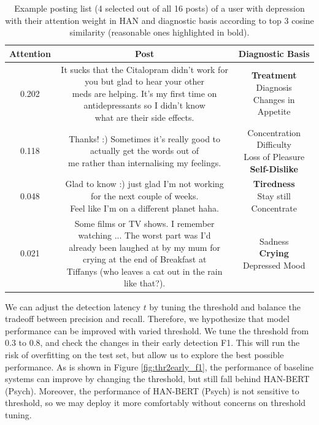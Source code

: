 \begin{table}[t]
    \centering
	\small
    \begin{tabular}{ccc}
        \hline
        Attention & Post & Diagnostic Basis \\
        \hline
        0.202 & \makecell[l]{It sucks that the Citalopram didn't work for you but glad to hear your other \\ meds are helping. It's my first time on antidepressants so I didn't know \\ what are their side effects.} & \makecell[c]{\textbf{Treatment} \\ Diagnosis \\ Changes in Appetite }\\
        \hline
        0.118 & \makecell[l]{Thanks! :) Sometimes it's really good to actually get the words out of  \\ me rather than internalising my feelings.} & \makecell[c]{Concentration Difficulty \\ Loss of Pleasure \\ \textbf{Self-Dislike}}\\
        \hline
        0.048 & \makecell[l]{Glad to know :) just glad I'm not working for the next couple of weeks. \\ Feel like I'm on a different planet haha.} & \makecell[c]{\textbf{Tiredness} \\ Stay still \\ Concentrate} \\
        \hline
        0.021 & \makecell[l]{Some films or TV shows. I remember watching ... The worst part was I'd  \\ already been laughed at by my mum for crying at the end of Breakfast at \\ Tiffanys (who leaves a cat out in the rain like that?). } & \makecell[c]{Sadness \\ \textbf{Crying} \\ Depressed Mood} \\
        \hline
        \end{tabular}
        \caption{\label{table:example} Example posting list (4 selected out of all 16 posts) of a user with depression with their attention weight in HAN and diagnostic basis according to top 3 cosine similarity (reasonable ones highlighted in bold).}
\end{table}

We can adjust the detection latency $t$ by tuning the threshold and balance the tradeoff between precision and recall. Therefore, we hypothesize that model performance can be improved with varied threshold. We tune the threshold from 0.3 to 0.8, and check the changes in their early detection F1. This will run the risk of overfitting on the test set, but allow us to explore the best possible performance. As is shown in Figure \ref{fig:thr2early_f1}, the performance of baseline systems can improve by changing the threshold, but still fall behind HAN-BERT (Psych). Moreover, the performance of HAN-BERT (Psych) is not sensitive to threshold, so we may deploy it more comfortably without concerns on threshold tuning.

